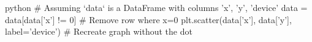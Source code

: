 python
    # Assuming `data` is a DataFrame with columns 'x', 'y', 'device'
    data = data[data['x'] != 0]  # Remove row where x=0
    plt.scatter(data['x'], data['y'], label='device')  # Recreate graph without the dot